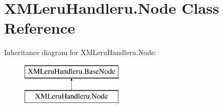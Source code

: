 \hypertarget{class_x_m_leru_handleru_1_1_node}{}\section{X\+M\+Leru\+Handleru.\+Node Class Reference}
\label{class_x_m_leru_handleru_1_1_node}
Inheritance diagram for X\+M\+Leru\+Handleru.\+Node\+:\begin{figure}[H]
\begin{center}
\leavevmode
\includegraphics[height=2.000000cm]{class_x_m_leru_handleru_1_1_node}
\end{center}
\end{figure}
